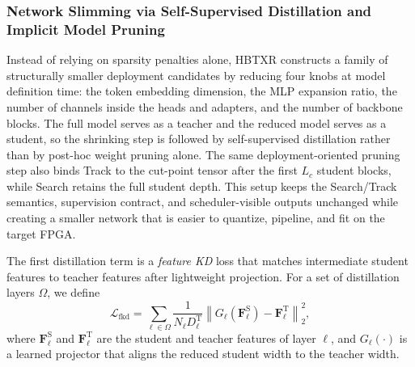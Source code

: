 \documentclass[journal]{IEEEtran}
\begin{document}
\subsubsection{Network Slimming via Self-Supervised Distillation and Implicit Model Pruning}
Instead of relying on sparsity penalties alone, HBTXR constructs a family of structurally smaller deployment candidates by reducing four knobs at model definition time: the token embedding dimension, the MLP expansion ratio, the number of channels inside the heads and adapters, and the number of backbone blocks. The full model serves as a teacher and the reduced model serves as a student, so the shrinking step is followed by self-supervised distillation rather than by post-hoc weight pruning alone. The same deployment-oriented pruning step also binds Track to the cut-point tensor after the first $L_c$ student blocks, while Search retains the full student depth. This setup keeps the Search/Track semantics, supervision contract, and scheduler-visible outputs unchanged while creating a smaller network that is easier to quantize, pipeline, and fit on the target FPGA.

The first distillation term is a \emph{feature KD} loss that matches intermediate student features to teacher features after lightweight projection. For a set of distillation layers $\Omega$, we define
\begin{equation}
\mathcal L_{\mathrm{fkd}}=
\sum_{\ell\in\Omega}
\frac{1}{N_{\ell}D_{\ell}^{\mathrm{T}}}
\left\|
G_{\ell}\!\left(\mathbf F_{\ell}^{\mathrm{S}}\right)
-\mathbf F_{\ell}^{\mathrm{T}}
\right\|_2^2,
\end{equation}
where $\mathbf F_{\ell}^{\mathrm{S}}$ and $\mathbf F_{\ell}^{\mathrm{T}}$ are the student and teacher features of layer $\ell$, and $G_{\ell}(\cdot)$ is a learned projector that aligns the reduced student width to the teacher width.
\end{document}
